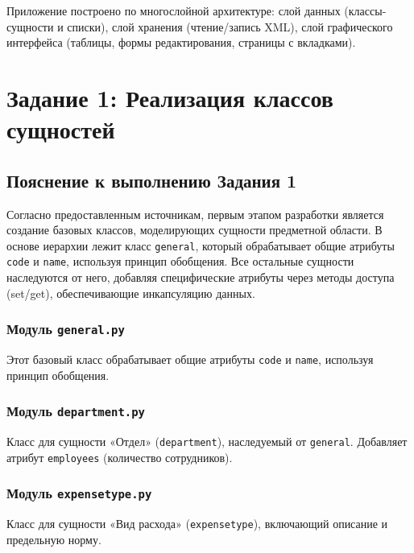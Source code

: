 \documentclass[14pt,a4paper]{extreport}
\begin{document}
Приложение построено по многослойной архитектуре: слой данных (классы-сущности и списки), слой хранения (чтение/запись XML), слой графического интерфейса (таблицы, формы редактирования, страницы с вкладками).

\chapter{Задание 1: Реализация классов сущностей}

\section{Пояснение к выполнению Задания 1}

Согласно предоставленным источникам, первым этапом разработки является создание базовых классов, моделирующих сущности предметной области. В основе иерархии лежит класс \texttt{general}, который обрабатывает общие атрибуты \texttt{code} и \texttt{name}, используя принцип обобщения. Все остальные сущности наследуются от него, добавляя специфические атрибуты через методы доступа (set/get), обеспечивающие инкапсуляцию данных.

\subsection{Модуль \texttt{general.py}}

Этот базовый класс обрабатывает общие атрибуты \texttt{code} и \texttt{name}, используя принцип обобщения.



\subsection{Модуль \texttt{department.py}}

Класс для сущности «Отдел» (\texttt{department}), наследуемый от \texttt{general}. Добавляет атрибут \texttt{employees} (количество сотрудников).



\subsection{Модуль \texttt{expensetype.py}}

Класс для сущности «Вид расхода» (\texttt{expensetype}), включающий описание и предельную норму.
\end{document}
